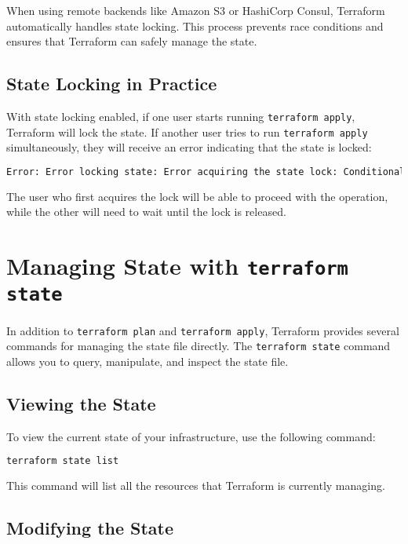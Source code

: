 When using remote backends like Amazon S3 or HashiCorp Consul, Terraform automatically handles state locking. This process prevents race conditions and ensures that Terraform can safely manage the state.

\subsection{State Locking in Practice}

With state locking enabled, if one user starts running \texttt{terraform apply}, Terraform will lock the state. If another user tries to run \texttt{terraform apply} simultaneously, they will receive an error indicating that the state is locked:

\begin{lstlisting}[language=bash]
Error: Error locking state: Error acquiring the state lock: ConditionalCheckFailedException: The conditional request failed
\end{lstlisting}

The user who first acquires the lock will be able to proceed with the operation, while the other will need to wait until the lock is released.

\section{Managing State with \texttt{terraform state}}

In addition to \texttt{terraform plan} and \texttt{terraform apply}, Terraform provides several commands for managing the state file directly. The \texttt{terraform state} command allows you to query, manipulate, and inspect the state file.

\subsection{Viewing the State}

To view the current state of your infrastructure, use the following command:

\begin{lstlisting}[language=bash]
terraform state list
\end{lstlisting}

This command will list all the resources that Terraform is currently managing.

\subsection{Modifying the State}

